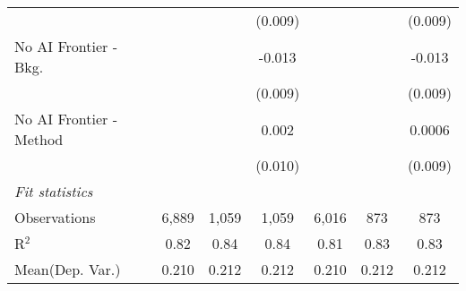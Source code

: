 \begin{tabular}{lcccccc}
                           &                &              & (0.009) &                &         & (0.009)\\   
   No AI Frontier - Bkg.   &                &              & -0.013  &                &         & -0.013\\   
                           &                &              & (0.009) &                &         & (0.009)\\   
   No AI Frontier - Method &                &              & 0.002   &                &         & 0.0006\\   
                           &                &              & (0.010) &                &         & (0.009)\\   
   \midrule
   \emph{Fit statistics}\\
   Observations            & 6,889          & 1,059        & 1,059   & 6,016          & 873     & 873\\  
   R$^2$                   & 0.82           & 0.84         & 0.84    & 0.81           & 0.83    & 0.83\\  
Mean(Dep. Var.) & 0.210 & 0.212 & 0.212 & 0.210 & 0.212 & 0.212 \\
   

\end{tabular}
